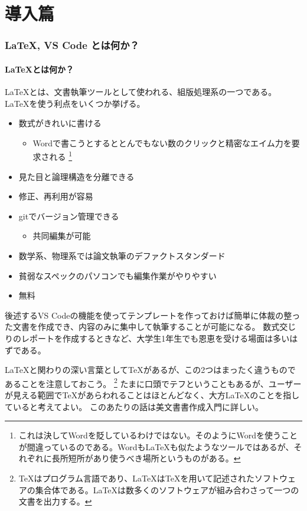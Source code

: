 \documentclass{ltjsarticle}
\begin{document}
\tableofcontents
\clearpage

\part{導入篇}
\section{\LaTeX , VS Code とは何か？}
\subsection{\LaTeX とは何か？}
\LaTeX とは、文書執筆ツールとして使われる、組版処理系の一つである。
\LaTeX を使う利点をいくつか挙げる。
\begin{itemize}
  \item 数式がきれいに書ける
  \begin{itemize}
    \item Wordで書こうとするととんでもない数のクリックと精密なエイム力を要求される
    \footnote{これは決してWordを貶しているわけではない。そのようにWordを使うことが間違っているのである。Wordも\LaTeX も似たようなツールではあるが、それぞれに長所短所があり使うべき場所というものがある。}
  \end{itemize}
  \item 見た目と論理構造を分離できる
  \item 修正、再利用が容易
  \item gitでバージョン管理できる
  \begin{itemize}
    \item 共同編集が可能
  \end{itemize}
  \item 数学系、物理系では論文執筆のデファクトスタンダード
  \item 貧弱なスペックのパソコンでも編集作業がやりやすい
  \item 無料
\end{itemize}
後述するVS Codeの機能を使ってテンプレートを作っておけば簡単に体裁の整った文書を作成でき、内容のみに集中して執筆することが可能になる。
数式交じりのレポートを作成するときなど、大学生1年生でも恩恵を受ける場面は多いはずである。

\LaTeX と関わりの深い言葉として\TeX があるが、この2つはまったく違うものであることを注意しておこう。
\footnote{\TeX はプログラム言語であり、\LaTeX は\TeX を用いて記述されたソフトウェアの集合体である。\LaTeX は数多くのソフトウェアが組み合わさって一つの文書を出力する。}
たまに口頭でテフということもあるが、ユーザーが見える範囲で\TeX があらわれることはほとんどなく、大方\LaTeX のことを指していると考えてよい。
このあたりの話は美文書書作成入門\cite{美文書本}に詳しい。
\end{document}
